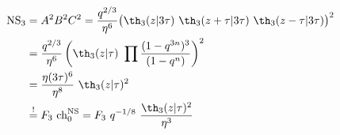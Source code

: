 \begin{equation}
  \begin{split}
{\rm NS}_3 &= A^2 B^2 C^2 = {q^{2/3} \over \eta^6} \big(
\th_3(z|3\tau) ~\th_3(z+\tau|3\tau) ~\th_3(z-\tau|3\tau) \big)^2 \\
&= {q^{2/3} \over \eta^6} \left( \th_3(z|\tau) ~\prod {(1-q^{3n})^3
  \over (1-q^n)} \right)^2 \\ 
&={\eta(3\tau)^6 \over \eta^8} ~\th_3(z|\tau)^2  \\
& \stackrel{!}{=} F_3~ {\rm ch}_0^{\rm NS} = F_3~q^{-1/8} ~{\th_3(z|\tau)^2
  \over \eta^3}
  \end{split}
\end{equation}

